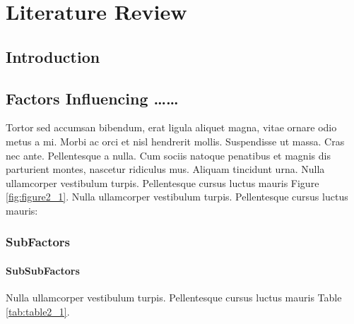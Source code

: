 
\chapter{Literature Review}\doublespacing %

\label{Chapter2} %



\section{Introduction}
\lipsum[1-2]


\section{Factors Influencing \ldots \ldots}
Tortor sed accumsan bibendum, erat ligula aliquet magna, vitae ornare odio metus a mi. Morbi ac orci et nisl hendrerit mollis. Suspendisse ut massa. Cras nec ante. Pellentesque a nulla. Cum sociis natoque penatibus et magnis dis parturient montes, nascetur ridiculus mus. Aliquam tincidunt urna. Nulla ullamcorper vestibulum turpis. Pellentesque cursus luctus mauris Figure \ref{fig:figure2_1}. Nulla ullamcorper vestibulum turpis. Pellentesque cursus luctus mauris:




\subsection{SubFactors}
\lipsum[1-2]

\subsubsection{SubSubFactors}
Nulla ullamcorper vestibulum turpis. Pellentesque cursus luctus mauris Table \ref{tab:table2_1}.
\lipsum[3-5]



